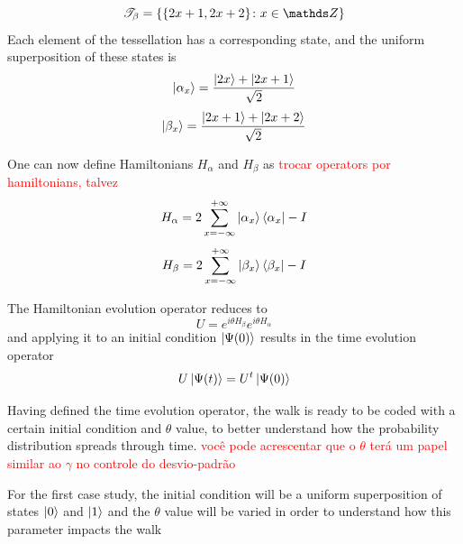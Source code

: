 \documentclass[../../dissertation.tex]{subfiles}
\begin{document}
\begin{equation}
	\mathscr{T}_{\beta}= \{\{2x+1,2x+2\}\colon x \in \Z\}
\end{equation}
Each element of the tessellation has a corresponding state, and the uniform superposition of these states is
\begin{equation}
	\ket{\alpha_x} = \frac{\ket{2x} + \ket{2x+1}}{\sqrt{2}}
\end{equation}
\begin{equation}
	\ket{\beta_x} = \frac{\ket{2x+1}+\ket{2x+2}}{\sqrt{2}}
\end{equation}\par
One can now define Hamiltonians $H_\alpha$ and $H_\beta$ as \textcolor{red}{trocar operators por hamiltonians, talvez} 
\begin{equation}
	H_\alpha = 2\sum_{x=-\infty}^{+\infty}\ket{\alpha_{x}}\bra{\alpha_x} - I
\end{equation}
\begin{equation}
	H_\beta = 2\sum_{x=-\infty}^{+\infty}\ket{\beta_{x}}\bra{\beta_x} - I
\end{equation}\par
The Hamiltonian evolution operator reduces to
\begin{equation}
	U = e^{i\theta H_\beta}e^{i\theta H_\alpha}
\end{equation}
and applying it to an initial condition $\ket{\Psi(0)}$ results in the time evolution operator
\begin{equation}
	U\ket{\Psi(t)} = U^t\ket{\Psi(0)}
\end{equation}\par
Having defined the time evolution operator, the walk is ready to be coded with a certain initial condition and $\theta$ value, to better understand how the probability distribution spreads through time. \textcolor{red}{você pode acrescentar que o $\theta$ terá um papel similar ao $\gamma$ no controle do desvio-padrão}

For the first case study, the initial condition will be a uniform superposition of states $\ket{0}$ and $\ket{1}$ and the $\theta$ value will be varied in order to understand how this parameter impacts the walk
\end{document}
